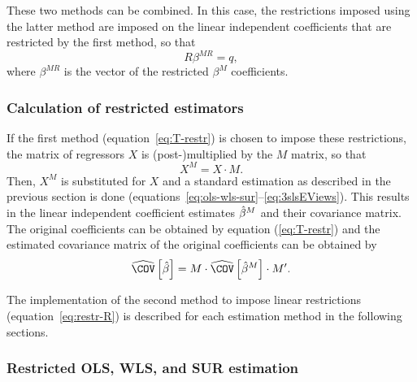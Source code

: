 These two methods can be combined.
In this case, the restrictions imposed using the latter method are
imposed on the linear independent coefficients
that are restricted by the first method, so that
\begin{equation}
   R \beta^{MR} = q ,
\end{equation}
where $\beta^{MR}$ is the vector of the restricted $\beta^M$ coefficients.


\subsubsection{Calculation of restricted estimators}

If the first method (equation~\ref{eq:T-restr}) is chosen
to impose these restrictions,
the matrix of regressors $X$ is (post-)\hspace{0pt}multiplied
by the $M$ matrix,
so that
\begin{equation}
    X^M = X \cdot M .
\end{equation}
Then, $X^M$ is substituted for $X$ and a standard estimation as described
in the previous section is done
(equations~\ref{eq:ols-wls-sur}--\ref{eq:3slsEViews}).
This results in the linear independent coefficient estimates $\hat{\beta}^M$ and
their covariance matrix.
The original coefficients can be obtained by equation (\ref{eq:T-restr})
and the estimated covariance matrix of the original coefficients
can be obtained by
\begin{equation}
   \COVHat \left[ \bHat \right]
   = M \cdot \COVHat \left[ \bHat^M \right] \cdot M' .
\end{equation}

The implementation of the second method to impose linear restrictions
(equation~\ref{eq:restr-R})
is described for each estimation method in the following sections.


\subsubsection{Restricted OLS, WLS, and SUR estimation}

